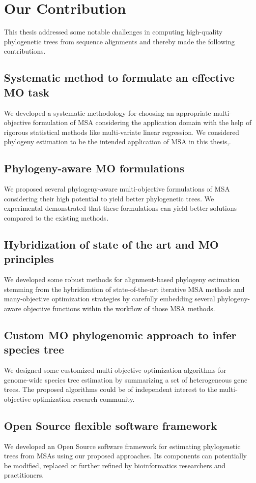 \section{Our Contribution}
This thesis addressed some notable challenges in computing high-quality phylogenetic trees from sequence alignments and thereby made the following contributions.

\subsection{Systematic method to formulate an effective MO task}
 We developed a systematic methodology for choosing an appropriate multi-objective formulation of MSA considering the application domain with the help of rigorous statistical methods like multi-variate linear regression. We considered phylogeny estimation to be the intended application of MSA in this thesis,.

\subsection{Phylogeny-aware MO formulations}
 We proposed several phylogeny-aware multi-objective formulations of MSA considering their high potential to yield better phylogenetic trees. We experimental demonstrated that these formulations can yield better solutions compared to the existing methods.

\subsection{Hybridization of state of the art and MO principles}
 We developed some robust methods for alignment-based phylogeny estimation stemming from the hybridization of state-of-the-art iterative MSA methods and many-objective optimization strategies by carefully embedding several phylogeny-aware objective functions within the workflow of those MSA methods.

\subsection{Custom MO phylogenomic approach to infer species tree}
 We designed some customized multi-objective optimization algorithms for genome-wide species tree estimation by summarizing a set of heterogeneous gene trees. The proposed algorithms could be of independent interest to the multi-objective optimization research community.

\subsection{Open Source flexible software framework}
 We developed an Open Source software framework for estimating phylogenetic trees from MSAs using our proposed approaches. Its components can potentially be modified, replaced or further refined by bioinformatics researchers and practitioners.

